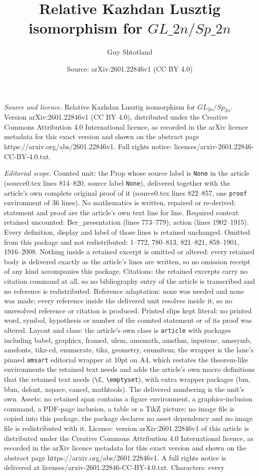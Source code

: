 \documentclass[10pt,a4paper]{amsart}
\title[Relative Kazhdan Lusztig isomorphism for $GL\_{2n}/Sp\_{2n}$]{Relative Kazhdan Lusztig isomorphism for $GL\_{2n}/Sp\_{2n}$}
\author{Guy Shtotland}
\date{Source: arXiv:2601.22846v1 (CC BY 4.0)}
\begin{document}
\maketitle

\noindent\emph{Source and licence.} Relative Kazhdan Lusztig isomorphism for $GL_{2n}/Sp_{2n}$. Version arXiv:2601.22846v1 (CC BY 4.0), distributed under the Creative Commons Attribution 4.0 International licence, as recorded in the arXiv licence metadata for this exact version and shown on the abstract page https://arxiv.org/abs/2601.22846v1. Full rights notice: licenses/arxiv-2601.22846-CC-BY-4.0.txt.\par\smallskip

\noindent\textit{Editorial scope.} Counted unit: the Prop whose source label is \texttt{None} in the article (source0.tex lines 814--820, source label \texttt{None}), delivered together with the article's own complete original proof of it (source0.tex lines 822--857, one \texttt{proof} environment of 36 lines). No mathematics is written, repaired or re-derived: statement and proof are the article's own text line for line. Required context retained uncounted: Ber\_presentation (lines 773--779); action (lines 1902--1915). Every definition, display and label of those lines is retained unchanged. Omitted from this package and not redistributed: 1--772, 780--813, 821--821, 858--1901, 1916--2008. Nothing inside a retained excerpt is omitted or altered: every retained body is delivered exactly as the article's lines are written, so no omission receipt of any kind accompanies this package. Citations: the retained excerpts carry no citation command at all, so no bibliography entry of the article is transcribed and no reference is redistributed. Reference adaptation: none was needed and none was made; every reference inside the delivered unit resolves inside it, so no unresolved reference or citation is produced. Printed slips kept literal: no printed word, symbol, hypothesis or number of the counted statement or of its proof was altered. Layout and class: the article's own class is \texttt{article} with packages including babel, graphicx, framed, ulem, amsmath, amsthm, inputenc, amssymb, amsfonts, tikz-cd, enumerate, tikz, geometry, enumitem; the wrapper is the lane's pinned \texttt{amsart} editorial wrapper at 10pt on A4, which restates the theorem-like environments the retained text needs and adds the article's own macro definitions that the retained text needs (\texttt{\textbackslash C}, \texttt{\textbackslash emptyset}), with extra wrapper packages (bm, bbm, dsfont, xspace, cancel, mathtools). The delivered numbering is the unit's own. Assets: no retained span contains a figure environment, a graphics-inclusion command, a PDF-page inclusion, a table or a TikZ picture; no image file is copied into this package, the package declares no asset dependency and no image file is redistributed with it. Licence: version arXiv:2601.22846v1 of this article is distributed under the Creative Commons Attribution 4.0 International licence, as recorded in the arXiv licence metadata for this exact version and shown on the abstract page https://arxiv.org/abs/2601.22846v1. A full rights notice is delivered at licenses/arxiv-2601.22846-CC-BY-4.0.txt. Characters: every 
\end{document}
